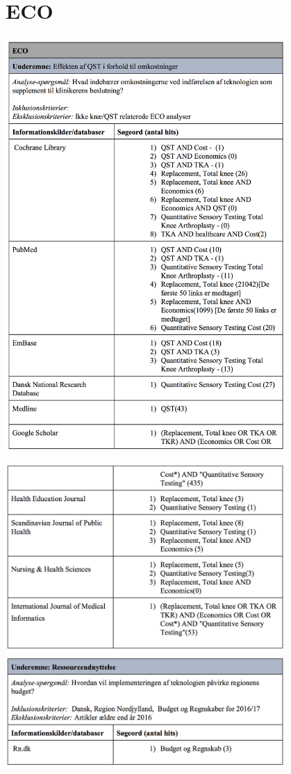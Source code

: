 \section{ECO}\label{ECO_sog}
\begin{center}
\includegraphics[width=0.8\textwidth]{rapportAfsnit/qBilag/sogninger/ECO1}

\includegraphics[width=0.8\textwidth]{rapportAfsnit/qBilag/sogninger/ECO2}
\end{center}






